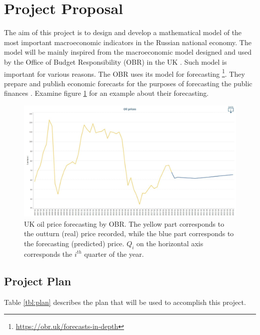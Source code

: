 

\section{Project Proposal}
The aim of this project is to design and develop a mathematical model of the most important macroeconomic indicators in the Russian national economy.
The model will be mainly inspired from the macroeconomic model designed and used by the Office of Budget Responsibility (OBR) in the UK \parencite{obr}.
Such model is important for various reasons.
The OBR uses its model for forecasting%
\footnote{\url{https://obr.uk/forecasts-in-depth}}.
They prepare and publish economic forecasts for the purposes of forecasting the public finances \parencite{obr2}.
Examine figure \ref{img:oil-prices} for an example about their forecasting.

\begin{figure}[!htb]
\centering
\includegraphics[width=1\textwidth]{images/oil-prices.jpg}
\caption{
UK oil price forecasting by OBR\protect\footnotemark.
The yellow part corresponds to the outturn (real) price recorded,
while the blue part corresponds to the forecasting (predicted) price.
$Q_i$ on the horizontal axis corresponds the $i^{th}$ quarter of the year.
}
\label{img:oil-prices}
\end{figure}





\subsection{Project Plan}
Table \ref{tbl:plan} describes the plan that will be used to accomplish this project.



